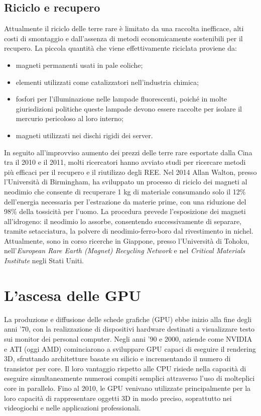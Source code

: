 \documentclass[12pt,a4paper,oneside]{book}
\begin{document}
\section{Riciclo e recupero}
Attualmente il riciclo delle terre rare è limitato da una raccolta inefficace, alti costi di smontaggio e dall’assenza di metodi economicamente sostenibili per il recupero.
La piccola quantità che viene effettivamente riciclata proviene da:
\begin{itemize}
    \item magneti permanenti usati in pale eoliche;
    \item elementi utilizzati come catalizzatori nell'industria chimica;
    \item fosfori per l'illuminazione nelle lampade fluorescenti, poiché in molte giurisdizioni politiche queste lampade devono essere raccolte per isolare il mercurio pericoloso al loro interno;
    \item magneti utilizzati nei dischi rigidi dei server.
\end{itemize}
In seguito all'improvviso aumento dei prezzi delle terre rare esportate dalla Cina tra il 2010 e il 2011, molti ricercatori hanno avviato studi per ricercare metodi più efficaci per il recupero e il riutilizzo degli REE.
Nel 2014 Allan Walton, presso l’Università di Birmingham, ha sviluppato un processo di riciclo dei magneti al neodimio che consente di recuperare 1 kg di materiale consumando solo il 12\% dell’energia necessaria per l’estrazione da materie prime, con una riduzione del 98\% della tossicità per l’uomo. La procedura prevede l'esposizione dei magneti all’idrogeno: il neodimio lo assorbe, consentendo successivamente di separare, tramite setacciatura, la polvere di neodimio-ferro-boro dal rivestimento in nichel.
Attualmente, sono in corso ricerche in Giappone, presso l'Università di Tohoku, nell'\textit{European Rare Earth (Magnet) Recycling Network} e nel \textit{Critical Materials Institute} negli Stati Uniti.

\chapter{L'ascesa delle GPU}
La produzione e diffusione delle schede grafiche (GPU) ebbe inizio alla fine degli anni '70, con la realizzazione di dispositivi hardware destinati a visualizzare testo sui monitor dei personal computer. Negli anni '90 e 2000, aziende come NVIDIA e ATI (oggi AMD) cominciarono a sviluppare GPU capaci di eseguire il rendering 3D, sfruttando architetture basate su silicio e incrementando il numero di transistor per core. Il loro vantaggio rispetto alle CPU risiede nella capacità di eseguire simultaneamente numerosi compiti semplici attraverso l'uso di molteplici core in parallelo. Fino al 2010, le GPU venivano utilizzate principalmente per la loro capacità di rappresentare oggetti 3D in modo preciso, soprattutto nei videogiochi e nelle applicazioni professionali.
\end{document}
